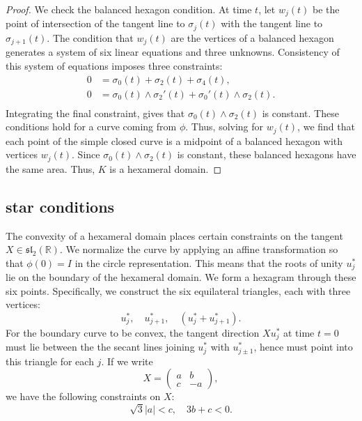 \documentclass[11pt]{amsart}
\newcommand{\ring}[1]{\mathbb{#1}}
\begin{document}
\begin{proof} 
  We check the balanced hexagon condition.  At time $t$, let $w_j(t)$
  be the point of intersection of the tangent line to $\sigma_j(t)$
  with the tangent line to $\sigma_{j+1}(t)$.  The condition that
  $w_j(t)$ are the vertices of a balanced hexagon generates a system
  of six linear equations and three unknowns.  Consistency of this
  system of equations imposes three constraints:
   \[
   \begin{array}{lll}
   0 &= \sigma_0(t) + \sigma_2(t) + \sigma_4(t),\\
   0 &= {\sigma_0(t)}\land{\sigma_2'(t)}+ {\sigma_0'(t)}\land{\sigma_2(t)}.\\
   \end{array}
   \]
   Integrating the final constraint, gives that
   ${\sigma_0(t)}\land{\sigma_2(t)}$ is constant.  These conditions
   hold for a curve coming from $\phi$.  Thus, solving for $w_j(t)$,
   we find that each point of the simple closed curve is a midpoint of
   a balanced hexagon with vertices $w _j(t)$.  Since
   ${\sigma_0(t)}\land{\sigma_2(t)}$ is constant, these balanced
   hexagons have the same area.  Thus, $K$ is a hexameral domain.
\end{proof}

\subsection{star conditions}\label{sec:star}

The convexity of a hexameral domain places certain constraints on the
tangent $X\in\mathfrak{sl}_2(\ring{R})$.  We normalize the curve by
applying an affine transformation so that $\phi(0)=I$ in the circle
representation.  This means that the roots of unity $u^*_j$ lie on the
boundary of the hexameral domain.  We form a hexagram through these
six points.  Specifically, we construct the six equilateral triangles,
each with three vertices:
\[
   u^*_j,\quad u^*_{j+1},\quad (u^*_j + u^*_{j+1}).
\]
For the boundary curve to be convex, the tangent direction $X u^*_j$
at time $t=0$ must lie between the the secant lines joining $u^*_j$
with $u^*_{j\pm 1}$, hence must point into this triangle for each $j$.
If we write
\[
X  = \left(\begin{matrix} a & b \\ c & -a \end{matrix}\right),
\]
we have the following constraints on $X$:
\begin{equation}\label{eqn:star}
\sqrt{3} |a| < c,\quad 3 b + c < 0.
\end{equation}
\end{document}
